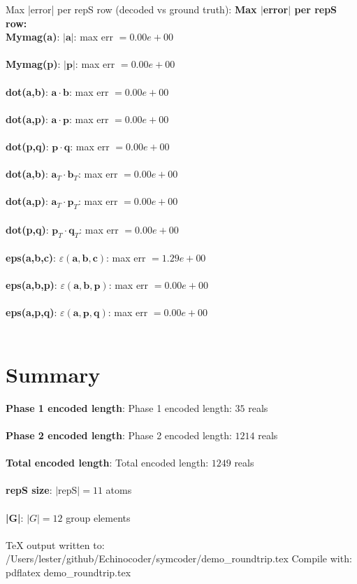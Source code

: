 \documentclass[a4paper,11pt]{article}
\newcommand{\vc}[1]{\ensuremath{\mathbf{#1}}}
\newcommand{\dnfagmiihhiejm}[1]{|\vc{#1}|}
\newcommand{\pdcegfomjfhook}[2]{\mathbf{#1} \cdot \mathbf{#2}}
\newcommand{\fpbeomcfokjooi}[2]{\mathbf{#1}_T \cdot \mathbf{#2}_T}
\newcommand{\kblbmcpggoncpf}[3]{\varepsilon(\mathbf{#1},\mathbf{#2},\mathbf{#3})}
\begin{document}
  Max |error| per repS row (decoded vs ground truth):
\textbf{Max $|$error$|$ per repS row:}\\
\textbf{    Mymag(a)}: $\dnfagmiihhiejm{a}$: max err $= 0.00e+00$\\\\
\textbf{    Mymag(p)}: $\dnfagmiihhiejm{p}$: max err $= 0.00e+00$\\\\
\textbf{    dot(a,b)}: $\pdcegfomjfhook{a}{b}$: max err $= 0.00e+00$\\\\
\textbf{    dot(a,p)}: $\pdcegfomjfhook{a}{p}$: max err $= 0.00e+00$\\\\
\textbf{    dot(p,q)}: $\pdcegfomjfhook{p}{q}$: max err $= 0.00e+00$\\\\
\textbf{    dot(a,b)}: $\fpbeomcfokjooi{a}{b}$: max err $= 0.00e+00$\\\\
\textbf{    dot(a,p)}: $\fpbeomcfokjooi{a}{p}$: max err $= 0.00e+00$\\\\
\textbf{    dot(p,q)}: $\fpbeomcfokjooi{p}{q}$: max err $= 0.00e+00$\\\\
\textbf{    eps(a,b,c)}: $\kblbmcpggoncpf{a}{b}{c}$: max err $= 1.29e+00$\\\\
\textbf{    eps(a,b,p)}: $\kblbmcpggoncpf{a}{b}{p}$: max err $= 0.00e+00$\\\\
\textbf{    eps(a,p,q)}: $\kblbmcpggoncpf{a}{p}{q}$: max err $= 0.00e+00$\\\\

\section{Summary}
\textbf{  Phase 1 encoded length}: Phase 1 encoded length: $35$ reals\\\\
\textbf{  Phase 2 encoded length}: Phase 2 encoded length: $1214$ reals\\\\
\textbf{  Total encoded length}: Total encoded length: $1249$ reals\\\\
\textbf{  repS size}: $|\text{repS}| = 11$ atoms\\\\
\textbf{  |G|}: $|G| = 12$ group elements\\\\

  TeX output written to: /Users/lester/github/Echinocoder/symcoder/demo\_roundtrip.tex
  Compile with:  pdflatex demo\_roundtrip.tex
\end{document}
